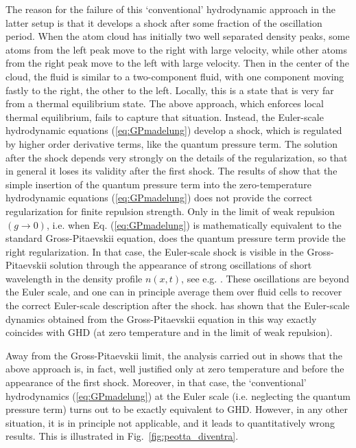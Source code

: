 \documentclass[onecolumn,amsfonts,showpacs,superscriptaddress]{revtex4-1}
\begin{document}
The reason for the failure of this `conventional' hydrodynamic approach in the latter setup is that it develops a shock after some fraction of the oscillation period. When the atom cloud has initially two well separated density peaks, some atoms from the left peak move to the right with large velocity, while other atoms from the right peak move to the left with large velocity. Then in the center of the cloud, the fluid is similar to a two-component fluid, with one component moving fastly to the right, the other to the left. Locally, this is a state that is very far from a thermal equilibrium state. The above approach, which enforces local thermal equilibrium, fails to capture that situation. Instead, the Euler-scale hydrodynamic equations (\ref{eq:GPmadelung}) develop a shock, which is regulated by higher order derivative terms, like the quantum pressure term. The solution after the shock depends very strongly on the details of the regularization, so that in general it loses its validity after the first shock. The results of \citep{peotta2014quantum} show that the simple insertion of the quantum pressure term into the zero-temperature hydrodynamic equations (\ref{eq:GPmadelung}) does not provide the correct regularization for finite repulsion strength. Only in the limit of weak repulsion $(g \rightarrow 0)$, i.e. when Eq. (\ref{eq:GPmadelung}) is mathematically equivalent to the standard Gross-Pitaevskii equation, does the quantum pressure term provide the right regularization. In that case, the Euler-scale shock is visible in the Gross-Pitaevskii solution through the appearance of strong oscillations of short wavelength in the density profile $n(x,t)$, see e.g. \citep{simmons2020quantum}. These oscillations are beyond the Euler scale, and one can in principle average them over fluid cells to recover the correct Euler-scale description after the shock. \cite{bettelheim2020whitham} has shown that the Euler-scale dynamics obtained from the Gross-Pitaevskii equation in this way exactly coincides with GHD (at zero temperature and in the limit of weak repulsion).


Away from the Gross-Pitaevskii limit, the analysis carried out in \citep{doyon2017large} shows that the above approach is, in fact, well justified only at zero temperature and before the appearance of the first shock. Moreover, in that case, the `conventional' hydrodynamics (\ref{eq:GPmadelung}) at the Euler scale (i.e. neglecting the quantum pressure term) turns out to be exactly equivalent to GHD. However, in any other situation, it is in principle not applicable, and it leads to quantitatively  wrong results. This is illustrated in Fig.~\ref{fig:peotta_diventra}.
\end{document}
